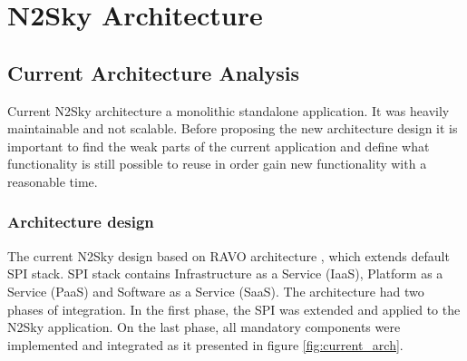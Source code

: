 \section{N2Sky Architecture}\label{TheN2SkyArchitecture}

\subsection{Current Architecture Analysis}\label{CurrentArchitectureAnalysis}

Current N2Sky architecture a monolithic standalone application. It was heavily maintainable and not scalable. Before proposing the new architecture design it is important to find the weak parts of the current application and define what functionality is still possible to reuse in order gain new functionality with a reasonable time.

\subsubsection{Architecture design}\label{Architecturedesign}

The current N2Sky design based on RAVO architecture \cite{ravo}, which extends default SPI stack. SPI stack contains Infrastructure as a Service (IaaS), Platform as a Service (PaaS) and Software as a Service (SaaS). The architecture had two phases of integration.  In the first phase, the SPI was extended and applied to the N2Sky application. On the last phase, all mandatory components were implemented and integrated as it presented in figure \ref{fig:current_arch}.

